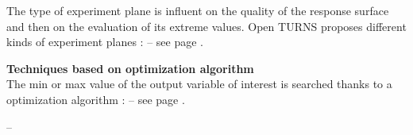 {  The type of experiment plane is influent on the quality of the response surface and then on the evaluation of its extreme values. Open TURNS proposes different kinds of experiment planes :  -- see page \pageref{docref_C11_ExperimentPlanes}.



  {\bf Techniques based on optimization algorithm}\\

  The min or max value of the output variable of interest is searched thanks to a optimization algorithm :  -- see page \pageref{docref_C11_OptimizationAlgo}.

}
{
  --
}


